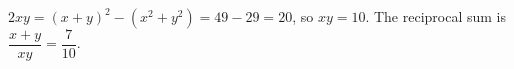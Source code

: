 $2xy=(x+y)^2-(x^2+y^2)=49-29=20$, so $xy=10$. The reciprocal sum is $\dfrac{x+y}{xy}=\boxed{\dfrac{7}{10}}$.
